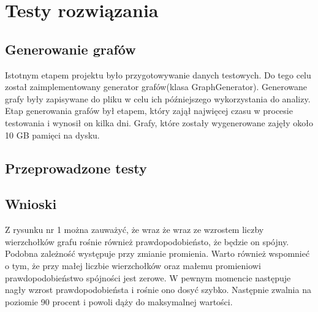 \section{Testy rozwiązania}
	\label{final:testy}

	\subsection{Generowanie grafów}
		\label{final:testy:generowanie}

		Istotnym etapem projektu było przygotowywanie danych testowych. Do tego celu został zaimplementowany generator grafów(klasa GraphGenerator). Generowane grafy były zapisywane do pliku w celu ich późniejszego wykorzystania do analizy. Etap generowania grafów był etapem, który zajął najwięcej czasu w procesie testowania i wynosił on kilka dni. Grafy, które zostały wygenerowane zajęły około 10 GB pamięci na dysku.
	\subsection{Przeprowadzone testy}
		\label{final:testy:przyklad1}
		
		
		
		
		
		
		
		
		

	\subsection{Wnioski}
		\label{final:testy:wnioski}
	
	Z rysunku nr 1 można zauważyć, że wraz że wraz ze wzrostem liczby wierzchołków grafu rośnie również prawdopodobieństo, że będzie on spójny. Podobna zależność występuje przy zmianie promienia. Warto również wspomnieć o tym, że przy małej liczbie wierzchołków oraz małemu promieniowi prawdopodobieństwo spójności jest zerowe. W pewnym momencie następuje nagły wzrost prawdopodobieństa i rośnie ono dosyć szybko. Następnie zwalnia na poziomie 90 procent i powoli dąży do maksymalnej wartości.

